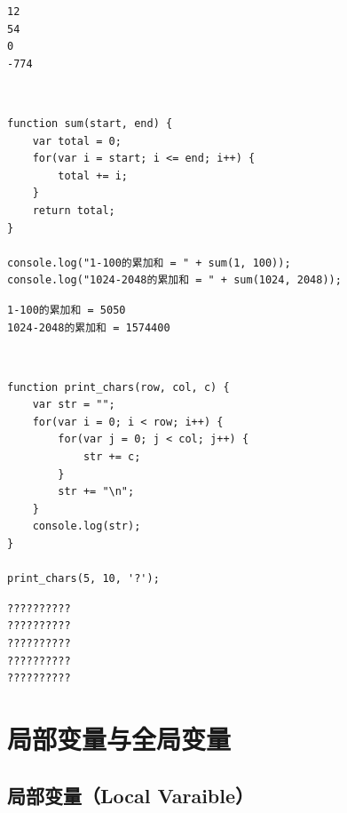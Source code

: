 \begin{tcolorbox}
	\begin{verbatim}
12
54
0
-774
	\end{verbatim}
\end{tcolorbox}

\vspace{0.5cm}

\\

\begin{lstlisting}[style=htmlcssjs]
function sum(start, end) {
    var total = 0;
    for(var i = start; i <= end; i++) {
        total += i;
    }
    return total;
}

console.log("1-100的累加和 = " + sum(1, 100));
console.log("1024-2048的累加和 = " + sum(1024, 2048));
\end{lstlisting}

\begin{tcolorbox}
	\begin{verbatim}
1-100的累加和 = 5050
1024-2048的累加和 = 1574400
	\end{verbatim}
\end{tcolorbox}

\vspace{0.5cm}

\\

\begin{lstlisting}[style=htmlcssjs]
function print_chars(row, col, c) {
    var str = "";
    for(var i = 0; i < row; i++) {
        for(var j = 0; j < col; j++) {
            str += c;
        }
        str += "\n";
    }
    console.log(str);
}

print_chars(5, 10, '?');
\end{lstlisting}

\begin{tcolorbox}
	\begin{verbatim}
??????????
??????????
??????????
??????????
??????????
	\end{verbatim}
\end{tcolorbox}

\newpage

\section{局部变量与全局变量}

\subsection{局部变量（Local Varaible）}

